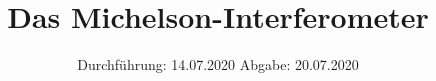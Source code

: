 

\subject{V401}
\title{Das Michelson-Interferometer}
\date{%
  Durchführung: 14.07.2020
  \hspace{3em}
  Abgabe: 20.07.2020
}



\maketitle
\thispagestyle{empty}
\tableofcontents
\newpage







\printbibliography{}


